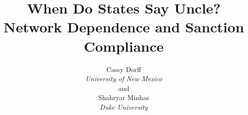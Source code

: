 \documentclass[12pt,onesided]{amsart}
\title{When Do States Say Uncle? Network Dependence and Sanction Compliance\\}
\author{Cassy Dorff\\
\textit{University of New Mexico}\\
and\\
Shahryar Minhas\\
\textit{Duke University}}
\begin{document}
\renewcommand{\abstractname}{ }
\maketitle\thispagestyle{empty}

\begin{abstract}
\abstractname{}
\singlespacing{}

\end{abstract}

\newpage\setcounter{page}{1} 













\newpage


\end{document}
